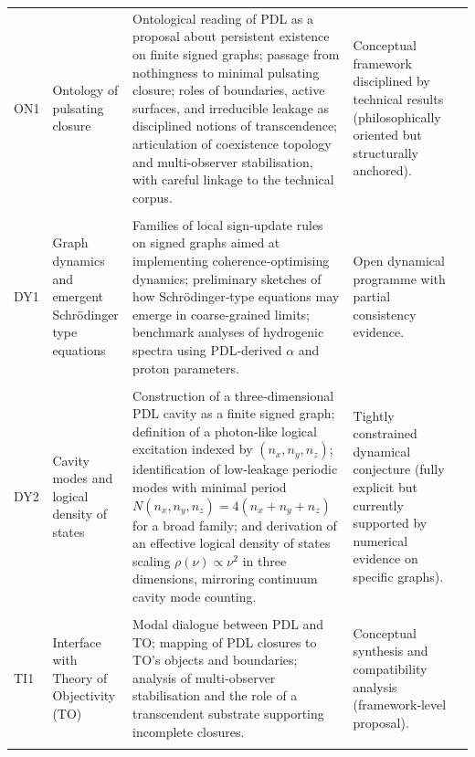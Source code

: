 \documentclass[11pt,a4paper]{article}
\begin{document}
\begin{longtable}{L{0.8cm}L{1.9cm}L{5.9cm}L{3cm}L{2.2cm}}
ON1 &
Ontology of pulsating closure &
Ontological reading of PDL as a proposal about persistent existence on finite signed graphs; passage from nothingness to minimal pulsating closure; roles of boundaries, active surfaces, and irreducible leakage as disciplined notions of transcendence; articulation of coexistence topology and multi‑observer stabilisation, with careful linkage to the technical corpus. &
Conceptual framework disciplined by technical results (philosophically oriented but structurally anchored). &
\citep{ExistencePulsatingClosure2026,PDL_Main_2026,PDL_position,PDL_TO_dialogue} \\\\[0.4em]

DY1 &
Graph dynamics and emergent Schr\"odinger type equations &
Families of local sign‑update rules on signed graphs aimed at implementing coherence‑optimising dynamics; preliminary sketches of how Schr\"odinger‑type equations may emerge in coarse‑grained limits; benchmark analyses of hydrogenic spectra using PDL‑derived $\alpha$ and proton parameters. &
Open dynamical programme with partial consistency evidence. &
\citep{Effective_Fields_PDL_2026,Schrodinger_Sketch_v2_2026,Schrodinger_PDL_v2_2026,PDL_position} \\\\[0.4em]

DY2 &
Cavity modes and logical density of states &
Construction of a three‑dimensional PDL cavity as a finite signed graph; definition of a photon‑like logical excitation indexed by $(n_x,n_y,n_z)$; identification of low‑leakage periodic modes with minimal period $N(n_x,n_y,n_z)=4(n_x+n_y+n_z)$ for a broad family; and derivation of an effective logical density of states scaling $\rho(\nu)\propto \nu^2$ in three dimensions, mirroring continuum cavity mode counting. &
Tightly constrained dynamical conjecture (fully explicit but currently supported by numerical evidence on specific graphs). &
\citep{PDLCavityModes2026,Effective_Fields_PDL_2026} \\\\[0.4em]

TI1 &
Interface with Theory of Objectivity (TO) &
Modal dialogue between PDL and TO; mapping of PDL closures to TO’s objects and boundaries; analysis of multi‑observer stabilisation and the role of a transcendent substrate supporting incomplete closures. &
Conceptual synthesis and compatibility analysis (framework‑level proposal). &
\citep{PDL_TO_dialogue,PDL_position,ExistencePulsatingClosure2026} \\\\[0.4em]


\end{longtable}
\end{document}
